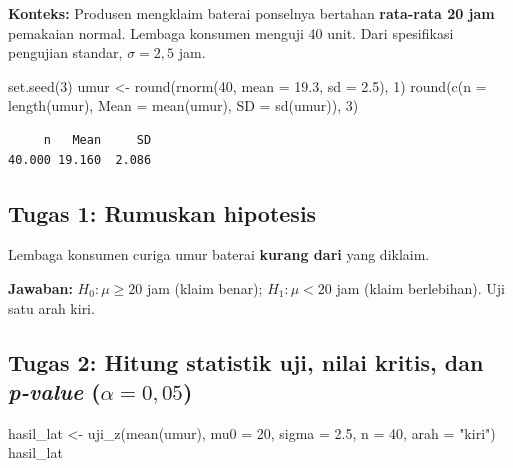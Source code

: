 \documentclass[
  indonesian,
  letterpaper,
]{book}
\newenvironment{Shaded}{\begin{snugshade}}{\end{snugshade}}
\newcommand{\AttributeTok}[1]{\textcolor[rgb]{0.40,0.45,0.13}{#1}}
\newcommand{\DecValTok}[1]{\textcolor[rgb]{0.68,0.00,0.00}{#1}}
\newcommand{\FloatTok}[1]{\textcolor[rgb]{0.68,0.00,0.00}{#1}}
\newcommand{\FunctionTok}[1]{\textcolor[rgb]{0.28,0.35,0.67}{#1}}
\newcommand{\NormalTok}[1]{\textcolor[rgb]{0.00,0.23,0.31}{#1}}
\newcommand{\OtherTok}[1]{\textcolor[rgb]{0.00,0.23,0.31}{#1}}
\newcommand{\StringTok}[1]{\textcolor[rgb]{0.13,0.47,0.30}{#1}}
\begin{document}
\textbf{Konteks:} Produsen mengklaim baterai ponselnya bertahan
\textbf{rata-rata 20 jam} pemakaian normal. Lembaga konsumen menguji 40
unit. Dari spesifikasi pengujian standar, \(\sigma = 2{,}5\) jam.

\begin{Shaded}
\begin{Highlighting}[]
\FunctionTok{set.seed}\NormalTok{(}\DecValTok{3}\NormalTok{)}
\NormalTok{umur }\OtherTok{\textless{}{-}} \FunctionTok{round}\NormalTok{(}\FunctionTok{rnorm}\NormalTok{(}\DecValTok{40}\NormalTok{, }\AttributeTok{mean =} \FloatTok{19.3}\NormalTok{, }\AttributeTok{sd =} \FloatTok{2.5}\NormalTok{), }\DecValTok{1}\NormalTok{)}
\FunctionTok{round}\NormalTok{(}\FunctionTok{c}\NormalTok{(}\AttributeTok{n =} \FunctionTok{length}\NormalTok{(umur), }\AttributeTok{Mean =} \FunctionTok{mean}\NormalTok{(umur), }\AttributeTok{SD =} \FunctionTok{sd}\NormalTok{(umur)), }\DecValTok{3}\NormalTok{)}
\end{Highlighting}
\end{Shaded}

\begin{verbatim}
     n   Mean     SD 
40.000 19.160  2.086 
\end{verbatim}

\subsection{Tugas 1: Rumuskan
hipotesis}\label{tugas-1-rumuskan-hipotesis}

Lembaga konsumen curiga umur baterai \textbf{kurang dari} yang diklaim.

\textbf{Jawaban:} \(H_0 : \mu \geq 20\) jam (klaim benar);
\(H_1 : \mu < 20\) jam (klaim berlebihan). Uji satu arah kiri.

\subsection{\texorpdfstring{Tugas 2: Hitung statistik uji, nilai kritis,
dan \emph{p-value}
(\(\alpha = 0{,}05\))}{Tugas 2: Hitung statistik uji, nilai kritis, dan p-value (\textbackslash alpha = 0\{,\}05)}}\label{tugas-2-hitung-statistik-uji-nilai-kritis-dan-p-value-alpha-005}

\begin{Shaded}
\begin{Highlighting}[]
\NormalTok{hasil\_lat }\OtherTok{\textless{}{-}} \FunctionTok{uji\_z}\NormalTok{(}\FunctionTok{mean}\NormalTok{(umur), }\AttributeTok{mu0 =} \DecValTok{20}\NormalTok{, }\AttributeTok{sigma =} \FloatTok{2.5}\NormalTok{, }\AttributeTok{n =} \DecValTok{40}\NormalTok{, }\AttributeTok{arah =} \StringTok{"kiri"}\NormalTok{)}
\NormalTok{hasil\_lat}
\end{Highlighting}
\end{Shaded}
\end{document}
